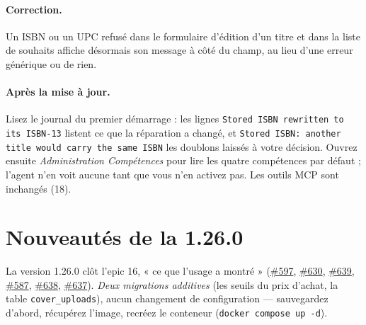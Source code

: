 \paragraph{Correction.} Un ISBN ou un UPC refusé dans le formulaire
d'édition d'un titre et dans la liste de souhaits affiche désormais son
message à côté du champ, au lieu d'une erreur générique ou de rien.

\paragraph{Après la mise à jour.} Lisez le journal du premier
démarrage : les lignes \texttt{Stored ISBN rewritten to its ISBN-13}
listent ce que la réparation a changé, et \texttt{Stored ISBN: another
title would carry the same ISBN} les doublons laissés à votre décision.
Ouvrez ensuite \emph{Administration \textrightarrow{} Compétences} pour
lire les quatre compétences par défaut ; l'agent n'en voit aucune tant
que vous n'en activez pas. Les outils MCP sont inchangés (18).

\section{Nouveautés de la 1.26.0}\label{sec:whats-new-1.26.0}

La version 1.26.0 clôt l'epic 16, « ce que l'usage a montré »
(\href{https://github.com/guycorbaz/mybibli/issues/597}{\#597},
\href{https://github.com/guycorbaz/mybibli/issues/630}{\#630},
\href{https://github.com/guycorbaz/mybibli/issues/639}{\#639},
\href{https://github.com/guycorbaz/mybibli/issues/587}{\#587},
\href{https://github.com/guycorbaz/mybibli/issues/638}{\#638},
\href{https://github.com/guycorbaz/mybibli/issues/637}{\#637}). \emph{Deux migrations additives} (les
seuils du prix d'achat, la table \texttt{cover\_uploads}), aucun
changement de configuration --- sauvegardez d'abord, récupérez l'image,
recréez le conteneur (\texttt{docker compose up -d}).

